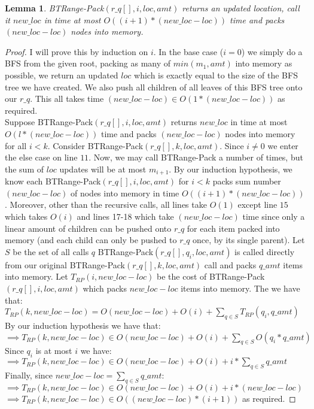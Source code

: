 \documentclass[letterpaper,12pt,titlepage,oneside,final]{book}
\theoremstyle{plain}
\newtheorem{lem}[thm]{Lemma}
\begin{document}
\begin{lem}
BT\textendash Range-Pack$(r\_q[], i, loc, amt)$ returns an updated location, call it $new\_loc$ in time at most $O((i+1)*(new\_loc - loc))$ time and packs $(new\_loc - loc)$ nodes into memory.
\end{lem}

\begin{proof}
I will prove this by induction on $i$. In the base case ($i=0$) we simply do a BFS from the given root, packing as many of $min(m_1, amt)$ into memory as possible, we return an updated $loc$ which is exactly equal to the size of the BFS tree we have created. We also push all children of all leaves of this BFS tree onto our $r\_q$. This all takes time $(new\_loc - loc) \in O(1*(new\_loc - loc))$ as required. \\

Suppose BT\textendash Range-Pack$(r\_q[], i, loc, amt)$ returns $new\_loc$ in time at most $O(l*(new\_loc - loc))$ time and packs $(new\_loc - loc)$ nodes into memory for all $i < k$. Consider BT\textendash Range-Pack$(r\_q[], k, loc, amt)$. Since $i \neq 0$ we enter the else case on line $11$. Now, we may call BT\textendash Range-Pack a number of times, but the sum of $loc$ updates will be at most $m_{i+1}$. By our induction hypothesis, we know each BT\textendash Range-Pack$(r\_q[], i, loc, amt)$ for $i < k$ packs sum number $(new\_loc - loc)$ of nodes into memory in time $O((i+1)*(new\_loc - loc))$. Moreover, other than the recursive calls, all lines take $O(1)$ except line $15$ which takes $O(i)$ and lines 17-18 which take $(new\_loc - loc)$ time since only a linear amount of children can be pushed onto $r\_q$ for each item packed into memory (and each child can only be pushed to $r\_q$ once, by its single parent). Let $S$ be the set of all calls $q$ BT\textendash Range-Pack$(r\_q[], q_i, loc, amt)$ is called directly from our original BT\textendash Range-Pack$(r\_q[], k, loc, amt)$ call and packs $q\_amt$ items into memory. Let $T_{RP}(i, new\_loc - loc)$ be the cost of BT\textendash Range-Pack$(r\_q[], i, loc, amt)$ which packs $new\_loc - loc$ items into memory. The we have that: \\

$T_{RP}(k, new\_loc - loc) = O(new\_loc - loc) + O(i) + \sum_{q \in S} T_{RP}(q_i, q\_amt)$ \\ 
By our induction hypothesis we have that: \\
$\implies T_{RP}(k, new\_loc - loc) \in O(new\_loc - loc) + O(i) + \sum_{q \in S} O(q_i*q\_amt)$ \\
Since $q_i$ is at most $i$ we have: \\
$\implies T_{RP}(k, new\_loc - loc) \in O(new\_loc - loc) + O(i) + i* \sum_{q \in S} q\_amt$ \\
Finally, since $new\_loc - loc = \sum_{q \in S} q\_amt$: \\
$\implies T_{RP}(k, new\_loc - loc) \in O(new\_loc - loc) + O(i) + i*(new\_loc - loc)$ \\
$\implies T_{RP}(k, new\_loc - loc) \in O((new\_loc - loc)*(i+1))$ as required.
\end{proof}
\end{document}
